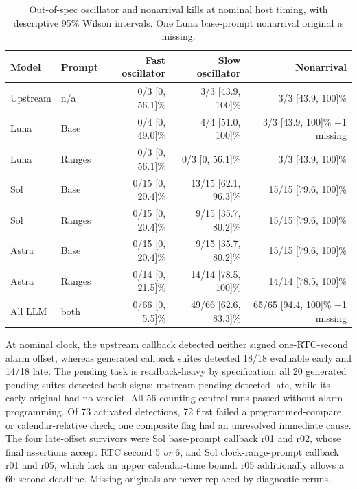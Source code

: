\documentclass[sigconf,nonacm]{acmart}
\begin{document}
\begin{table}[t]
\caption{Out-of-spec oscillator and nonarrival kills at nominal host timing, with descriptive 95\% Wilson intervals. One Luna base-prompt nonarrival original is missing.}
\label{tab:faults}
\small
\begin{tabular}{@{}llrrr@{}}
\toprule
Model & Prompt & Fast oscillator & Slow oscillator & Nonarrival \\
\midrule
Upstream & n/a & 0/3 [0, 56.1]\% & 3/3 [43.9, 100]\% & 3/3 [43.9, 100]\% \\
Luna & Base & 0/4 [0, 49.0]\% & 4/4 [51.0, 100]\% & 3/3 [43.9, 100]\% +1 missing \\
Luna & Ranges & 0/3 [0, 56.1]\% & 0/3 [0, 56.1]\% & 3/3 [43.9, 100]\% \\
Sol & Base & 0/15 [0, 20.4]\% & 13/15 [62.1, 96.3]\% & 15/15 [79.6, 100]\% \\
Sol & Ranges & 0/15 [0, 20.4]\% & 9/15 [35.7, 80.2]\% & 15/15 [79.6, 100]\% \\
Astra & Base & 0/15 [0, 20.4]\% & 9/15 [35.7, 80.2]\% & 15/15 [79.6, 100]\% \\
Astra & Ranges & 0/14 [0, 21.5]\% & 14/14 [78.5, 100]\% & 14/14 [78.5, 100]\% \\
\midrule
All LLM & both & 0/66 [0, 5.5]\% & 49/66 [62.6, 83.3]\% & 65/65 [94.4, 100]\% +1 missing \\
\bottomrule
\end{tabular}
\end{table}

At nominal clock, the upstream callback detected neither signed one-RTC-second alarm offset, whereas generated callback suites detected 18/18 evaluable early and 14/18 late. The pending task is readback-heavy by specification: all 20 generated pending suites detected both signs; upstream pending detected late, while its early original had no verdict. All 56 counting-control runs passed without alarm programming. Of 73 activated detections, 72 first failed a programmed-compare or calendar-relative check; one composite flag had an unresolved immediate cause. %
The four late-offset survivors were Sol base-prompt callback r01 and r02, whose final assertions accept RTC second 5 \emph{or} 6, and Sol clock-range-prompt callback r01 and r05, which lack an upper calendar-time bound. r05 additionally allows a 60-second deadline. Missing originals are never replaced by diagnostic reruns.
\end{document}
